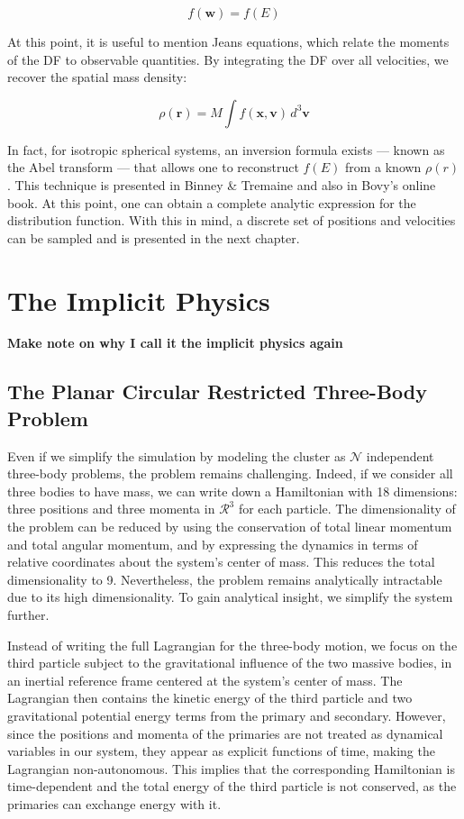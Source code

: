         \[
        f(\mathbf{w}) = f(E)
        \]

        At this point, it is useful to mention Jeans equations, which relate the moments of the DF to observable quantities. By integrating the DF over all velocities, we recover the spatial mass density:

        \[
        \rho(\mathbf{r}) = M \int f(\mathbf{x}, \mathbf{v}) \, d^3\mathbf{v}
        \]

        In fact, for isotropic spherical systems, an inversion formula exists — known as the Abel transform — that allows one to reconstruct \( f(E) \) from a known \( \rho(r) \). This technique is presented in Binney \& Tremaine and also in Bovy's online book. At this point, one can obtain a complete analytic expression for the distribution function. With this in mind, a discrete set of positions and velocities can be sampled and is presented in the next chapter.

        



\section{The Implicit Physics}
    \textbf{Make note on why I call it the implicit physics again}
    \subsection{The Planar Circular Restricted Three-Body Problem}
        
        Even if we simplify the simulation by modeling the cluster as $\mathcal{N}$ independent three-body problems, the problem remains challenging. Indeed, if we consider all three bodies to have mass, we can write down a Hamiltonian with 18 dimensions: three positions and three momenta in $\mathcal{R}^3$ for each particle. The dimensionality of the problem can be reduced by using the conservation of total linear momentum and total angular momentum, and by expressing the dynamics in terms of relative coordinates about the system's center of mass. This reduces the total dimensionality to 9. Nevertheless, the problem remains analytically intractable due to its high dimensionality. To gain analytical insight, we simplify the system further.
        
        Instead of writing the full Lagrangian for the three-body motion, we focus on the third particle subject to the gravitational influence of the two massive bodies, in an inertial reference frame centered at the system's center of mass. The Lagrangian then contains the kinetic energy of the third particle and two gravitational potential energy terms from the primary and secondary. However, since the positions and momenta of the primaries are not treated as dynamical variables in our system, they appear as explicit functions of time, making the Lagrangian non-autonomous. This implies that the corresponding Hamiltonian is time-dependent and the total energy of the third particle is not conserved, as the primaries can exchange energy with it.

